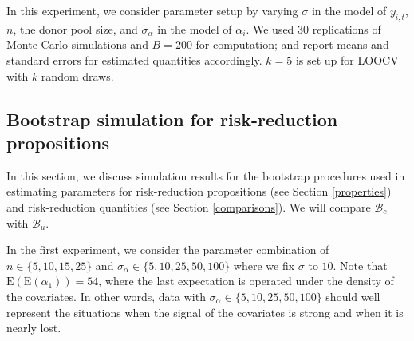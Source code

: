 \documentclass[11pt]{article}
\def\mc#1{\mathcal{#1}} %
\def\E#1{\mathrm{E}(#1)} %
\theoremstyle{definition}
\begin{document}
In this experiment, we consider parameter setup by varying $\sigma$ in the model of $y_{i,t}$, $n$, the donor pool size, and $\sigma_{\alpha}$ in the model of $\alpha_i$. We used $30$ replications of Monte Carlo simulations and $B = 200$ for computation; and report means and standard errors for estimated quantities accordingly. $k=5$ is set up for LOOCV with $k$ random draws.


\subsection{Bootstrap simulation for risk-reduction propositions}
\label{parametricbootstrapsimulation}

In this section, we discuss simulation results for the bootstrap procedures used in estimating parameters for risk-reduction propositions (see Section \ref{properties}) and risk-reduction quantities (see Section \ref{comparisons}). We will compare $\mc{B}_c$ with $\mc{B}_u$.

In the first experiment, we consider the parameter combination of  $n \in \{5, 10, 15, 25\}$ and $\sigma_{\alpha} \in  \{5, 10, 25, 50, 100\}$ where we fix $\sigma$ to $10$. Note that $\E{\E{\alpha_1}}=54$, where the last expectation is operated under the density of the covariates. In other words, data with $\sigma_{\alpha} \in  \{5, 10, 25, 50, 100\}$  should well represent the situations when the signal of the covariates is strong and when it is nearly lost.
\end{document}
